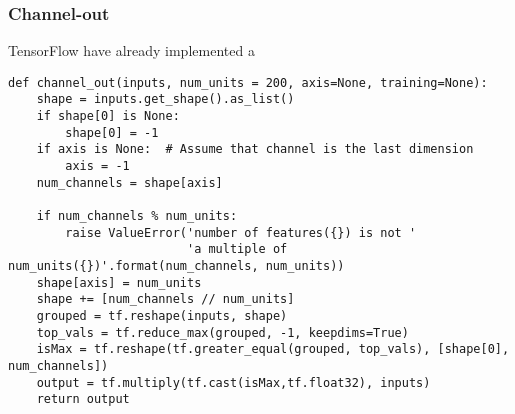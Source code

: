 \subsubsection*{Channel-out}
TensorFlow have already implemented a 
\lstset{style=Python}
\begin{lstlisting}[caption={Python-file for calling dataframe and calculating $M_{lll}$.},captionpos=b, label={lst:df_mlll}]
def channel_out(inputs, num_units = 200, axis=None, training=None):
    shape = inputs.get_shape().as_list()
    if shape[0] is None:
        shape[0] = -1
    if axis is None:  # Assume that channel is the last dimension
        axis = -1
    num_channels = shape[axis]
    
    if num_channels % num_units:
        raise ValueError('number of features({}) is not '
                         'a multiple of num_units({})'.format(num_channels, num_units))
    shape[axis] = num_units
    shape += [num_channels // num_units]
    grouped = tf.reshape(inputs, shape)
    top_vals = tf.reduce_max(grouped, -1, keepdims=True)
    isMax = tf.reshape(tf.greater_equal(grouped, top_vals), [shape[0], num_channels])
    output = tf.multiply(tf.cast(isMax,tf.float32), inputs)
    return output  
\end{lstlisting}

